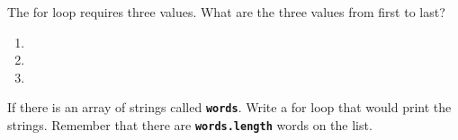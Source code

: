 \documentclass[letterpaper,12pt]{exam}
\begin{document}
\begin{questions}
\begin{samepage}
    \question The for loop requires three values.  What are the three values from first to last?
      \begin{enumerate}
        \item 
        \vspace{5mm}
        \item 
        \vspace{5mm}
        \item 
        \vspace{5mm}
       \end{enumerate}
\end{samepage}
\begin{samepage}
    \question If there is an array of strings called \texttt{\textbf{words}}.  Write a for loop that would print the strings.  Remember that there are \texttt{\textbf{words.length}} words on the list.
    \vspace{5mm}
\end{samepage}


\begin{samepage}
    \question 
    \vspace{5mm}
\end{samepage}


\end{questions}
\end{document}
